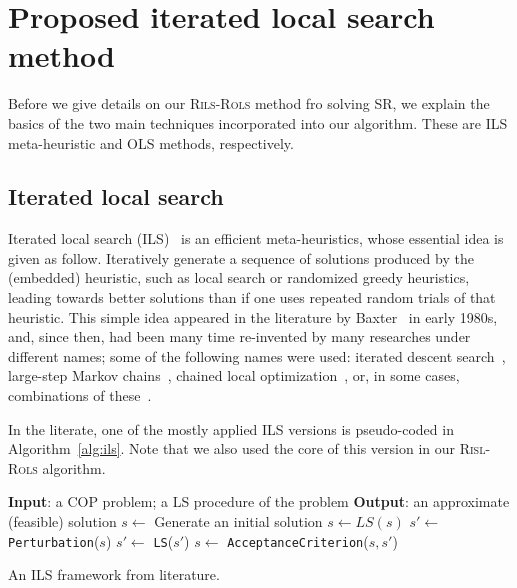 \documentclass[a4paper,12pt]{elsarticle}
\begin{document}


\section{Proposed iterated local search method}\label{sec:rils}
   Before we give details on our \textsc{Rils-Rols} method fro solving SR, we explain the basics of the two main techniques incorporated into our algorithm. These are ILS meta-heuristic and OLS methods, respectively. 
   
  \subsection{Iterated local search}
    Iterated local search (ILS)~\cite{lourencco2003iterated} is an efficient meta-heuristics, whose essential idea is given as follow. Iteratively generate a sequence of solutions produced by the (embedded) heuristic, such as local search or  randomized greedy heuristics,  leading
    towards better solutions than if one uses repeated random trials of that heuristic. This simple idea appeared in the literature by Baxter~\cite{baxter1981local} in early 1980s, and, since then, had been many time re-invented by many researches under different names; some of the following names were used: iterated descent search~\cite{baum1998iterated}, large-step
    Markov chains~\cite{martin1991large}, chained local optimization~\cite{martin1996combining}, or, in some cases,  combinations of these~\cite{applegate2003chained}. 
  
   In the literate, one of the mostly applied ILS versions is pseudo-coded in Algorithm~\ref{alg:ils}. Note that we also used the core of this version in our \textsc{Risl-Rols} algorithm. 
   
   \begin{algorithm}
  		\begin{algorithmic}[1] 
  			 \State \textbf{Input}: a COP problem; a LS procedure  of the problem 
  	 		\State \textbf{Output}: an approximate (feasible) solution 
  	 		\State $s \gets$ Generate an initial solution
  	 		\State  $s \gets LS(s)$
   	    		 \State  $s' \gets$ \texttt{Perturbation}($s$)
   	    		 \State  $s' \gets$ \texttt{LS}($s'$)
   	    		 \State  $ s \gets$ \texttt{AcceptanceCriterion}($s, s'$)
   	 		\EndWhile
   		\end{algorithmic}
    	\caption{An ILS framework from   literature.}
    	   	     \label{alg:ils}
    \end{algorithm}  
   
\end{document}
